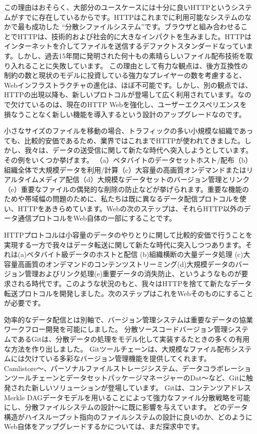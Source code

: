 \documentclass{sig-alternate}
\begin{document}
この理由はおそらく、大部分のユースケースには十分に良いHTTPというシステムがすでに存在しているからです。HTTPはこれまでに利用可能なシステムのなかで最も成功した ``分散シファイルシステム''です。ブラウザと組み合わせることでHTTPは、技術的および社会的に大きなインパクトを生みました。HTTPはインターネットを介してファイルを送信するデファクトスタンダードなっています。しかし、過去15年間に発明された何十もの素晴らしいファイル配布技術を取り入れることに失敗しています。 この理由として有力な観点は、後方互換性の制約の数と現状のモデルに投資している強力なプレイヤーの数を考慮すると、Webインフラストラクチャの進化は、ほぼ不可能です。しかし、別の観点では、HTTPの出現以降も、新しいプロトコルが登場して広く利用されています。なので欠けているのは、現在のHTTP Webを強化し、ユーザーエクスペリエンスを損なうことなく新しい機能を導入するという設計のアップグレードなのです。

小さなサイズのファイルを移動の場合、トラフィックの多い小規模な組織であっても、比較的安価であるため、業界ではこれまでHTTPが使われてきました。しかし、我々は、データの送受信に関して新たな時代へ突入しようとしています。その例をいくつか挙げます。
（a）ペタバイトのデータセットホスト/配布（b）組織全体で大規模データを利用/計算（c）大容量の高画質オンデマンドまたはリアルタイムメディア配信（d）大規模なデータセットのバージョン管理とリンク（e）重要なファイルの偶発的な削除の防止などが挙げられます。重要な機能のためや帯域幅の問題のために、私たちは既に異なるデータ配信プロトコルを使い、HTTPをあきらめています。Webの次のステップは、それらHTTP以外のデータ通信プロトコルをWeb自体の一部にすることです。


HTTPプロトコルは小容量のデータのやりとりに関して比較的安価で行うことを実現する一方で我々はデータ転送に関して新たな時代に突入しつつあります。それは(a)ペタバイト級データのホストと配信 (b)組織横断の大量データ処理 (c)大容量高画質のオンデマンドのコンテンツストリーミング(d)大規模データのバージョン管理およびリンク処理(e)重要データの消失防止、というようなものが要求される時代です。このような状況のもと、我々はHTTPを捨てて新たなデータ転送プロトコルを開発しました。次のステップはこれをWebそのものにすることが必要です。

効率的なデータ配信とは別軸で、バージョン管理システムは重要なデータの協業ワークフロー開発を可能にしました。 分散ソースコードバージョン管理システムであるGitは、分散データの処理をモデル化して実装するたときの多くの有用な方法を作り出しました。 Gitツールチェーンは、大規模なファイル配布システムには欠けている多彩なバージョン管理機能を提供してくれます。 Camlistore〜\cite{Camlistore}、パーソナルファイルストレージシステム、データコラボレーションツールチェーンとデータセットパッケージマネージャーのDat〜\cite {Dat}など、Gitに触発された新しいソリューションが登場しています。
Gitは、コンテンツアドレスMerkle DAGデータモデルを用いることによって強力なファイル分散戦略を可能にし、分散ファイルシステムの設計〜\cite{mashtizadeh13}に既に影響を与えています。
どのデータ構造がハイスループット指向のファイルシステムの設計に良いのか、どのようにWeb自体をアップグレードするかについては、まだ探求中です。
\end{document}
